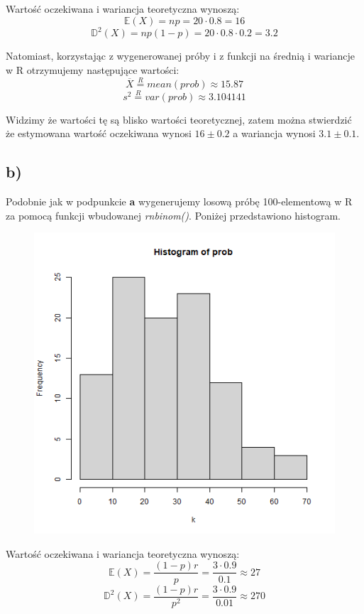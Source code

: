 \documentclass{article}
\begin{document}
Wartość oczekiwana i wariancja teoretyczna wynoszą:
\[ \mathbb{E}(X) = np = 20\cdot0.8 = 16 \]
\[ \mathbb{D}^2(X) = np(1-p) = 20\cdot 0.8\cdot 0.2 = 3.2 \]

Natomiast, korzystając z wygenerowanej próby i z funkcji na średnią i wariancje w R otrzymujemy następujące wartości:
\[ \overline{X} \overset{R}{=} mean(prob) \approx 15.87 \]
\[ s^2 \overset{R}{=} var(prob) \approx 3.104141 \]

Widzimy że wartości tę są blisko wartości teoretycznej, zatem można stwierdzić że estymowana wartość oczekiwana wynosi $16 \pm 0.2$ a wariancja wynosi $3.1 \pm 0.1$.

\subsection{b)}
Podobnie jak w podpunkcie \textbf{a} wygenerujemy losową próbę 100-elementową w R za pomocą funkcji wbudowanej \textit{rnbinom()}. Poniżej przedstawiono histogram.
\begin{figure}[h!]
\begin{center}
\includegraphics[height = 0.5\textheight, angle = 0]{"lab7zad6_b.png"}
\end{center}
\end{figure}

Wartość oczekiwana i wariancja teoretyczna wynoszą:
\[ \mathbb{E}(X) = \frac{(1-p)r}{p} = \frac{3\cdot0.9}{0.1} \approx 27 \]
\[ \mathbb{D}^2(X) = \frac{(1-p)r}{p^2} = \frac{3\cdot0.9}{0.01} \approx 270 \]
\end{document}
